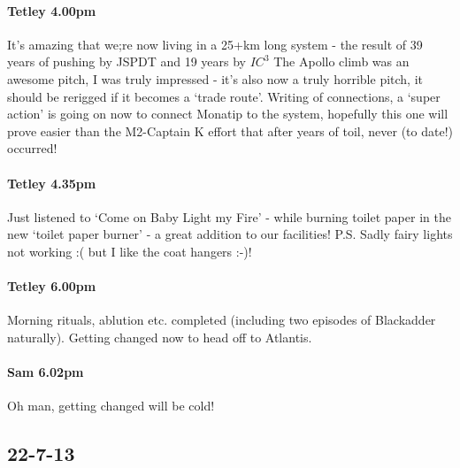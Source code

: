 \paragraph{Tetley 4.00pm}
It’s amazing that we;re now living in a 25+km long system - the result of 39 years of pushing by JSPDT and 19 years by $IC^3$ The Apollo climb was an awesome pitch, I was truly impressed - it’s also now a truly horrible pitch, it should be rerigged if it becomes a ‘trade route’. Writing of connections, a ‘super action’ is going on now to connect Monatip to the system, hopefully this one will prove easier than the M2-Captain K effort that after years of toil, never (to date!) occurred!


\paragraph{Tetley 4.35pm}
Just listened to ‘Come on Baby Light my Fire’ - while burning toilet paper in the new ‘toilet paper burner’ - a great addition to our facilities!
P.S. Sadly fairy lights not working :( but I like the coat hangers :-)!

\paragraph{Tetley 6.00pm}
Morning rituals, ablution etc. completed (including two episodes of Blackadder naturally). Getting changed now to head off to Atlantis.


\paragraph{Sam 6.02pm}
Oh man, getting changed will be cold!

\subsection{22-7-13}

